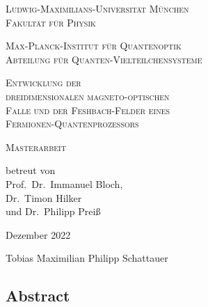 \begin{titlepage}
    \vspace*{\fill}
    \centering

    \textsc{\Large Ludwig-Maximilians-Universität München}\\
    \textsc{Fakultät für Physik}

    \vspace{1cm}

    \textsc{\Large Max-Planck-Institut für Quantenoptik}\\
    \textsc{Abteilung für Quanten-Vielteilchensysteme}

    \vspace{2.1cm}

    \begin{minipage}{1\textwidth}
        \centering
            \textsc{\huge{
                Entwicklung der\\
                dreidimensionalen magneto-optischen\\
                Falle und der Feshbach-Felder eines\\
                Fermionen-Quantenprozessors\\
            }}
    \end{minipage}


    \vspace{2.1cm}
    \huge \textsc{Masterarbeit}



    \vspace{0.3cm}
    \large \textrm{betreut von\\Prof.~Dr.~Immanuel Bloch,\\Dr.~Timon Hilker\\und Dr.~Philipp Preiß}

    \vspace{1.5cm}
    \huge
    \textrm{Dezember 2022}

    \vspace{1.5cm}
    \Large \textrm{Tobias Maximilian Philipp Schattauer}

    \vspace*{\fill}
\end{titlepage}

\begin{titlepage}
    \null\vspace{3cm}
    \centering
    \begin{minipage}{0.8\textwidth}
        \section*{Abstract}
        
    \end{minipage}
\end{titlepage}



\tableofcontents
\newpage